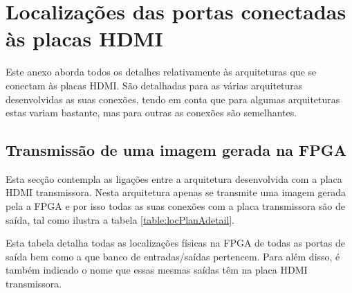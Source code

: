 {\tiny \chapter{Localizações das portas conectadas às placas HDMI} \label{ap3:LOCs}}

Este anexo aborda todos os detalhes relativamente às arquiteturas que se conectam às placas HDMI. São detalhadas para as várias arquiteturas 
desenvolvidas as suas conexões, tendo em conta que para algumas arquiteturas estas variam bastante, mas para outras as conexões são semelhantes.
%
\section{Transmissão de uma imagem gerada na FPGA} \label{ap3:imagemFPGA_TX}
Esta secção contempla as ligações entre a arquitetura desenvolvida com a placa HDMI transmissora. Nesta arquitetura apenas se transmite uma imagem gerada pela a FPGA e por isso todas as suas conexões com a placa transmissora são de saída, tal como ilustra a tabela \ref{table:locPlanAdetail}. 

Esta tabela detalha todas as localizações físicas na FPGA de todas as portas de saída bem como a que banco de entradas/saídas pertencem. Para além disso, é também indicado o nome que essas mesmas saídas têm na placa HDMI transmissora.

